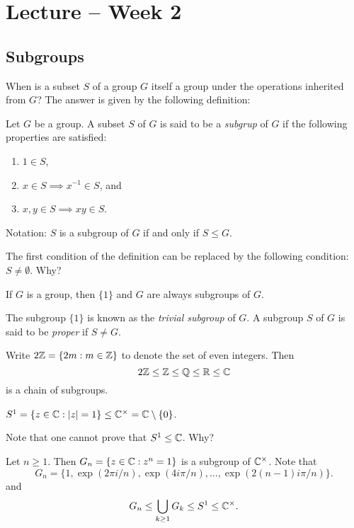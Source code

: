 \section{Lecture -- Week 2}

\subsection{Subgroups}

When is a subset $S$ of a group $G$ itself a group under the operations inherited from $G$? The answer is given by the following definition:

\begin{definition}
    Let $G$ be a group. 
        A subset $S$ of $G$ is said to be a \emph{subgrup} of $G$ 
        if the following properties are satisfied:
        \begin{enumerate}
                \item $1\in S$,
                \item $x\in S\implies x^{-1}\in S$, and 
                \item $x,y\in S\implies xy\in S$.
        \end{enumerate}
        Notation: $S$ is a subgroup of $G$ if and only if $S\leq G$.
\end{definition}

The first condition of the definition can be replaced by
the following condition: $S\ne\emptyset$. Why? 

\begin{example}
    If $G$ is a group, then 
    $\{1\}$ and $G$ are always subgroups of $G$. 
\end{example}

The subgroup $\{1\}$ is known as the \emph{trivial subgroup} of $G$. 
A subgroup $S$ of $G$ is said to be \emph{proper} if $S\ne G$. 

\begin{example}
Write $2\mathbb{Z}=\{2m:m\in\mathbb{Z}\}$ to denote the set of even integers. Then 
\[
2\mathbb{Z}\leq\mathbb{Z}\leq\mathbb{Q}\leq\mathbb{R}\leq\mathbb{C}
\]
is a chain of subgroups. 
\end{example}

\begin{example}
$S^1=\{z\in\mathbb{C}:|z|=1\}\leq\mathbb{C}^\times=\mathbb{C}\setminus\{0\}$.
\end{example}

Note that one cannot prove that $S^1\leq\mathbb{C}$. Why?

\begin{example}
Let $n\geq1$. Then $G_n=\{z\in\mathbb{C}:z^
n=1\}$ is a subgroup of $\mathbb{C}^\times$. 
Note that
\[
G_n=\{1,\exp(2\pi i/n),\exp(4i\pi/n),\dots,\exp(2(n-1)i\pi/n)\}.
\]
and 
\[
G_n\leq\bigcup_{k\geq1}G_k\leq S^1\leq\mathbb{C}^\times.
\]
\end{example}

